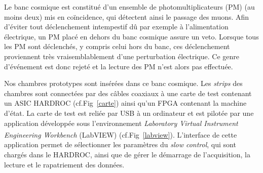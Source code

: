 Le banc cosmique est constitué d'un ensemble de photomultiplicateurs (PM) (au moins deux) mis en coïncidence, qui détectent ainsi le passage des muons. Afin d'éviter tout déclenchement intempestif dû par exemple à l'alimentation électrique, un PM placé en dehors du banc cosmique assure un veto. Lorsque tous les PM sont déclenchés, y compris celui hors du banc, ces déclenchement proviennent très vraisemblablement d'une perturbation électrique. Ce genre d'événement est donc rejeté et la lecture des PM n'est alors pas effectuée.

Nos chambres prototypes sont insérées dans ce banc cosmique. Les \textit{strips} des chambres sont connectées par des câbles coaxiaux à une carte de test contenant un ASIC HARDROC (cf.Fig~\ref{carte}) ainsi qu'un FPGA contenant la machine d'état. La carte de test est reliée par USB à un ordinateur et est pilotée par une application développée sous l'environnement \textit{Laboratory Virtual Instrument Engineering Workbench} (LabVIEW\textsuperscript{\textregistered}) (cf.Fig~\ref{labview}). L'interface de cette application permet de sélectionner les paramètres du \textit{slow control}, qui sont chargés dans le HARDROC, ainsi que de gérer le démarrage de l'acquisition, la lecture et le rapatriement des données. 

